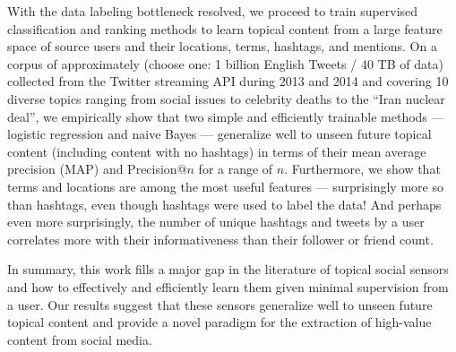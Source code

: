 With the data labeling bottleneck resolved, we proceed to train
supervised classification and ranking methods to learn topical content
from a large feature space of source users and their locations, terms,
hashtags, and mentions.  On a corpus of approximately (choose one: 1
billion English Tweets / 40 TB of data) collected from the Twitter
streaming API during 2013 and 2014 and covering 10 diverse topics
ranging from social issues to celebrity deaths to the ``Iran nuclear
deal'', we empirically show that two simple and efficiently trainable
methods --- logistic regression and naive Bayes --- generalize well to
unseen future topical content (including content with no hashtags) in
terms of their mean average precision (MAP) and Precision@$n$ for a
range of $n$.  Furthermore, we show that terms and locations are among
the most useful features --- surprisingly more so than hashtags, even
though hashtags were used to label the data!  And perhaps even more
surprisingly, the number of unique hashtags and tweets by a user
correlates more with their informativeness than their follower or
friend count.

In summary, this work fills a major gap in the literature of topical
social sensors and how to effectively and efficiently learn them given
minimal supervision from a user.  Our results suggest that these
sensors generalize well to unseen future topical content and provide a
novel paradigm for the extraction of high-value content from social
media.


